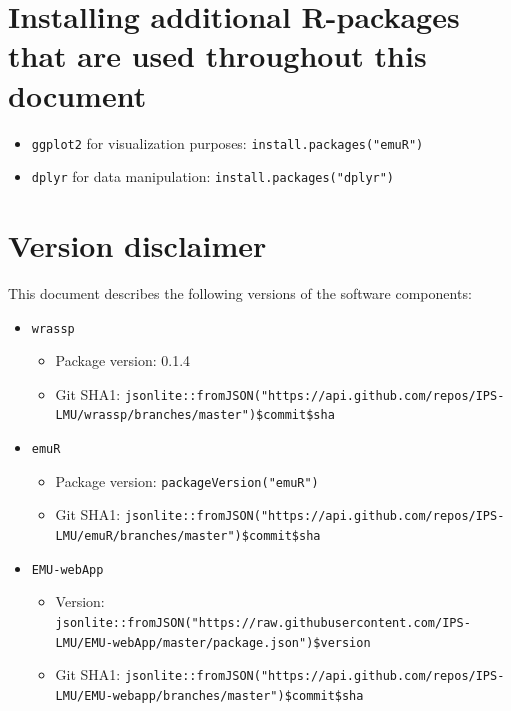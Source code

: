\documentclass[]{book}
\providecommand{\tightlist}{%
  \setlength{\itemsep}{0pt}\setlength{\parskip}{0pt}}
\theoremstyle{definition}
\theoremstyle{definition}
\theoremstyle{definition}
\theoremstyle{remark}
\begin{document}
\section{Installing additional R-packages that are used throughout this
document}\label{installing-additional-r-packages-that-are-used-throughout-this-document}

\begin{itemize}
\tightlist
\item
  \texttt{ggplot2} for visualization purposes:
  \texttt{install.packages("emuR")}
\item
  \texttt{dplyr} for data manipulation:
  \texttt{install.packages("dplyr")}
\end{itemize}

\section{Version disclaimer}\label{version-disclaimer}

This document describes the following versions of the software
components:

\begin{itemize}
\tightlist
\item
  \texttt{wrassp}

  \begin{itemize}
  \tightlist
  \item
    Package version: 0.1.4
  \item
    Git SHA1:
    \texttt{jsonlite::fromJSON("https://api.github.com/repos/IPS-LMU/wrassp/branches/master")\$commit\$sha}
  \end{itemize}
\item
  \texttt{emuR}

  \begin{itemize}
  \tightlist
  \item
    Package version: \texttt{packageVersion("emuR")}
  \item
    Git SHA1:
    \texttt{jsonlite::fromJSON("https://api.github.com/repos/IPS-LMU/emuR/branches/master")\$commit\$sha}
  \end{itemize}
\item
  \texttt{EMU-webApp}

  \begin{itemize}
  \tightlist
  \item
    Version:
    \texttt{jsonlite::fromJSON("https://raw.githubusercontent.com/IPS-LMU/EMU-webApp/master/package.json")\$version}
  \item
    Git SHA1:
    \texttt{jsonlite::fromJSON("https://api.github.com/repos/IPS-LMU/EMU-webapp/branches/master")\$commit\$sha}
  \end{itemize}
\end{itemize}
\end{document}
